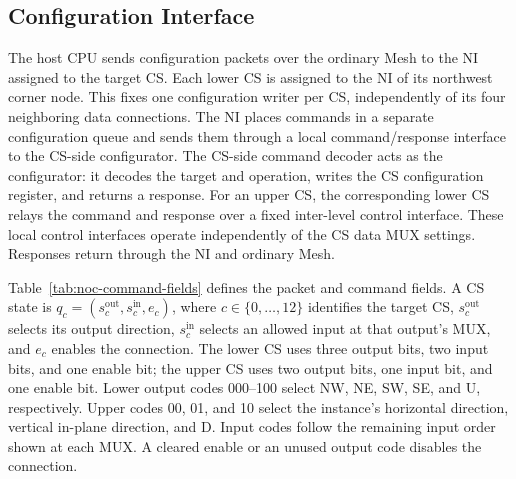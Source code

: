 \documentclass[conference,10pt]{IEEEtran}
\begin{document}



\subsection{Configuration Interface}
\label{sec:noc-config-interface}

The host CPU sends configuration packets over the ordinary Mesh to the
NI assigned to the target CS. Each lower CS is assigned to the NI of
its northwest corner node. This fixes one configuration writer per CS,
independently of its four neighboring data connections.
The NI places commands in a separate configuration queue and sends them
through a local command/response interface to the CS-side configurator.
The CS-side command decoder acts as the configurator: it decodes the
target and operation, writes the CS configuration register, and returns
a response.
For an upper CS, the corresponding lower CS relays the command and
response over a fixed inter-level control interface.
These local control interfaces operate independently of the CS data
MUX settings. Responses return through the NI and ordinary Mesh.

Table~\ref{tab:noc-command-fields} defines the packet and command fields.
A CS state is $q_c=(s_c^{\mathrm{out}},s_c^{\mathrm{in}},e_c)$, where
$c\in\{0,\ldots,12\}$ identifies the target CS,
$s_c^{\mathrm{out}}$ selects its output direction,
$s_c^{\mathrm{in}}$ selects an allowed input at that output's MUX,
and $e_c$ enables the connection.
The lower CS uses three output bits, two input bits, and one enable bit;
the upper CS uses two output bits, one input bit, and one enable bit.
Lower output codes 000--100 select NW, NE, SW, SE, and U, respectively.
Upper codes 00, 01, and 10 select the instance's horizontal direction,
vertical in-plane direction, and D. Input codes follow the remaining
input order shown at each MUX. A cleared enable or an unused output
code disables the connection.
\end{document}
